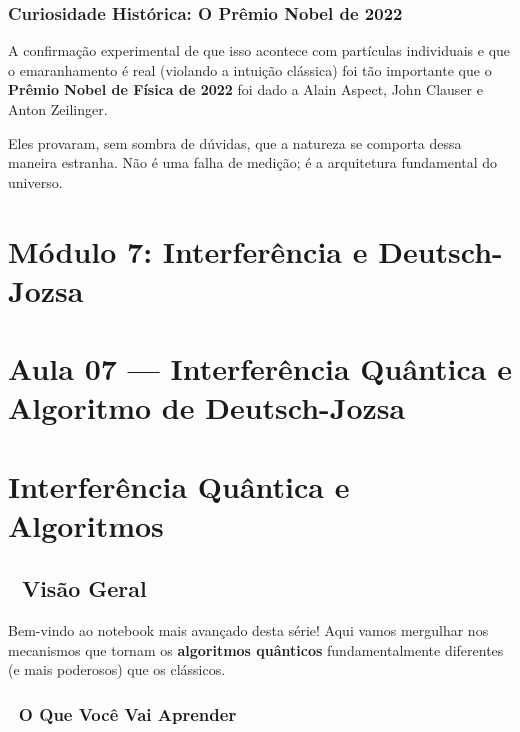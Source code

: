 \documentclass[
  brazilian,
]{report}
\begin{document}
\subsection{Curiosidade Histórica: O Prêmio Nobel de
2022}\label{curiosidade-histuxf3rica-o-pruxeamio-nobel-de-2022}

A confirmação experimental de que isso acontece com partículas
individuais e que o emaranhamento é real (violando a intuição clássica)
foi tão importante que o \textbf{Prêmio Nobel de Física de 2022} foi
dado a Alain Aspect, John Clauser e Anton Zeilinger.

Eles provaram, sem sombra de dúvidas, que a natureza se comporta dessa
maneira estranha. Não é uma falha de medição; é a arquitetura
fundamental do universo.

\newpage

\chapter{Módulo 7: Interferência e
Deutsch-Jozsa}\label{muxf3dulo-7-interferuxeancia-e-deutsch-jozsa}

\chapter{Aula 07 --- Interferência Quântica e Algoritmo de
Deutsch-Jozsa}\label{aula-07-interferuxeancia-quuxe2ntica-e-algoritmo-de-deutsch-jozsa}

\chapter{Interferência Quântica e
Algoritmos}\label{interferuxeancia-quuxe2ntica-e-algoritmos}

\section{📖 Visão Geral}\label{visuxe3o-geral}

Bem-vindo ao notebook mais avançado desta série! Aqui vamos mergulhar
nos mecanismos que tornam os \textbf{algoritmos quânticos}
fundamentalmente diferentes (e mais poderosos) que os clássicos.

\subsection{🎯 O Que Você Vai
Aprender}\label{o-que-vocuxea-vai-aprender-1}
\end{document}
